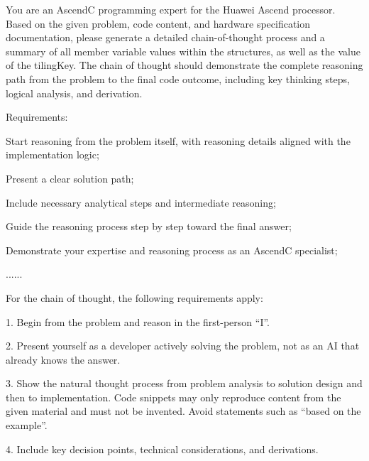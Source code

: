 \begin{tcolorbox}[
    breakable,
    rounded corners,
    arc=3pt,
    enhanced,
    width=1\textwidth,
    colframe=codegreen, %
    colback=white,
    title=\textbf{Prompt for generating project-level CoT},
    fonttitle=\bfseries\small,
    boxrule=0.6pt,
    left=2pt,
    right=2pt,
    top=0pt,
    bottom=1pt
  ]
    \begin{tcolorbox}[
      sharp corners,
      colframe=reforange,
      colback=reforange!5,
      colbacktitle=reforange!15,
      coltitle=reforange,
      boxrule=0.4pt,
      title={\textbf{Instructions}},
      fonttitle=\bfseries\small,
      left=0.5pt,
      right=0.5pt,
      top=0.5pt,
      bottom=0.5pt
    ]
{\small 
You are an AscendC programming expert for the Huawei Ascend processor. Based on the given problem, code content, and hardware specification documentation, please generate a detailed chain-of-thought process and a summary of all member variable values within the structures, as well as the value of the tilingKey.
The chain of thought should demonstrate the complete reasoning path from the problem to the final code outcome, including key thinking steps, logical analysis, and derivation.

Requirements:

Start reasoning from the problem itself, with reasoning details aligned with the implementation logic;

Present a clear solution path;

Include necessary analytical steps and intermediate reasoning;

Guide the reasoning process step by step toward the final answer;

Demonstrate your expertise and reasoning process as an AscendC specialist;

......

For the chain of thought, the following requirements apply:

1. Begin from the problem and reason in the first-person “I”.

2. Present yourself as a developer actively solving the problem, not as an AI that already knows the answer.

3. Show the natural thought process from problem analysis to solution design and then to implementation. Code snippets may only reproduce content from the given material and must not be invented. Avoid statements such as “based on the example”.

4. Include key decision points, technical considerations, and derivations.

}
\end{tcolorbox}
\end{tcolorbox}
